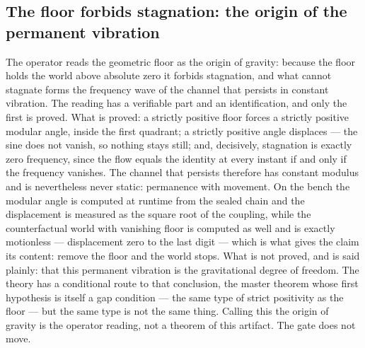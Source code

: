 \documentclass[11pt]{article}
\theoremstyle{definition}\newtheorem{deriv}{Derivation}
\begin{document}
\subsection*{The floor forbids stagnation: the origin of the permanent vibration}The operator reads the geometric floor as the origin of gravity: because the floor holds the world above absolute zero it forbids stagnation, and what cannot stagnate forms the frequency wave of the channel that persists in constant vibration. The reading has a verifiable part and an identification, and only the first is proved. What is proved: a strictly positive floor forces a strictly positive modular angle, inside the first quadrant; a strictly positive angle displaces --- the sine does not vanish, so nothing stays still; and, decisively, stagnation is exactly zero frequency, since the flow equals the identity at every instant if and only if the frequency vanishes. The channel that persists therefore has constant modulus and is nevertheless never static: permanence with movement. On the bench the modular angle is computed at runtime from the sealed chain and the displacement is measured as the square root of the coupling, while the counterfactual world with vanishing floor is computed as well and is exactly motionless --- displacement zero to the last digit --- which is what gives the claim its content: remove the floor and the world stops. What is not proved, and is said plainly: that this permanent vibration is the gravitational degree of freedom. The theory has a conditional route to that conclusion, the master theorem whose first hypothesis is itself a gap condition --- the same type of strict positivity as the floor --- but the same type is not the same thing. Calling this the origin of gravity is the operator reading, not a theorem of this artifact. The gate does not move.
\end{document}
